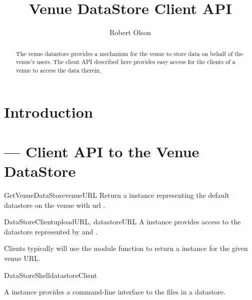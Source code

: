 \documentclass{howto}
\title{Venue DataStore Client API}
\author{Robert Olson}
\begin{document}
\maketitle

\begin{abstract}
\noindent
The venue datastore provides a mechanism for the venue to store data
on behalf of the venue's users. The client API described here provides
easy access for the clients of a venue to access the data therein.
\end{abstract}

\tableofcontents

\section{Introduction \label{intro}}

%
%

\section{ --- Client API to the
Venue DataStore}


\begin{funcdesc}{GetVenueDataStore}{venueURL}
Return a   instance representing the default
datastore on the venue with url .
\end{funcdesc}


\begin{classdesc}{DataStoreClient}{uploadURL, datastoreURL}
A   instance provides access to the datastore
represented by  and .

Clients typically will use the module function
 to return a 
instance for the given venue URL.

\end{classdesc}

\begin{classdesc}{DataStoreShell}{datastoreClient}

A  instance provides a command-line interface to
the files in a datastore.

\end{classdesc}
\end{document}
